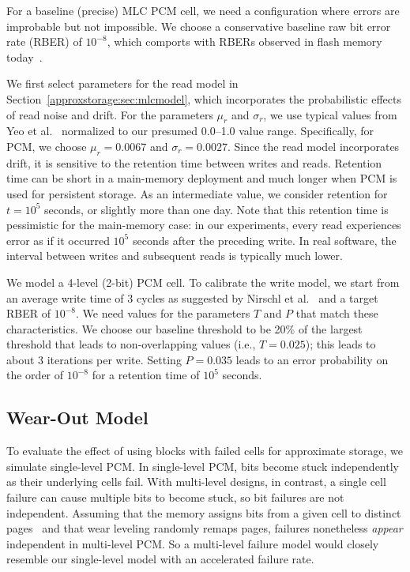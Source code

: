 For a baseline (precise) MLC PCM cell, we need a configuration where
errors are improbable but not impossible. We choose a conservative
baseline raw bit error rate (RBER) of $10^{-8}$, which comports with
RBERs observed in flash memory today~\cite{flasherror,flasherrors}.

We first select parameters for the read model in Section~\ref{approxstorage:sec:mlcmodel},
which incorporates the probabilistic effects of read noise and drift.
For the parameters $\mu_r$ and $\sigma_r$, we use typical values from
Yeo et al.~\cite{wdddmlcpcm} normalized to our presumed 0.0--1.0 value
range. Specifically, for PCM, we choose $\mu_r = 0.0067$ and $\sigma_r
= 0.0027$. Since the read model incorporates drift, it is sensitive to
the retention time between writes and reads. Retention time can be
short in a main-memory deployment and much longer when PCM is
used for persistent storage.  As an intermediate value, we consider
retention for $t = 10^{5}$ seconds, or slightly more than one day.
Note that this retention time is pessimistic for the main-memory
case: in our experiments, every read experiences error as if it
occurred $10^5$ seconds after the preceding write. In real software,
the interval between writes and subsequent reads is typically much
lower.

We model a 4-level (2-bit) PCM cell. To calibrate the write model, we start from an average write
time of 3 cycles as suggested by Nirschl et
al.~\cite{mlcwritestrategies} and a target RBER of $10^{-8}$.
We need values for the parameters $T$ and $P$ that
match these characteristics. We choose our baseline threshold to be 20\%
of the largest threshold that leads to non-overlapping values
(i.e., $T = 0.025$); this leads to about 3 iterations per write.
Setting $P = 0.035$ leads to an error probability on the order of
$10^{-8}$ for a retention time of $10^5$ seconds.

\subsection{Wear-Out Model}
\label{approxstorage:sec:wearmodel}

To evaluate the effect of using blocks with failed cells for approximate
storage, we simulate single-level PCM.
In single-level PCM,
bits become
stuck independently as their underlying cells fail.
With multi-level designs, in contrast, a single cell failure can cause
multiple bits to become stuck, so bit failures are not independent.
Assuming that the memory assigns bits from a given cell to distinct
pages~\cite{mlcflash} and that wear leveling randomly remaps pages,
failures nonetheless \emph{appear} independent in multi-level PCM.
So a multi-level
failure model would closely resemble our single-level model with an
accelerated failure rate.

